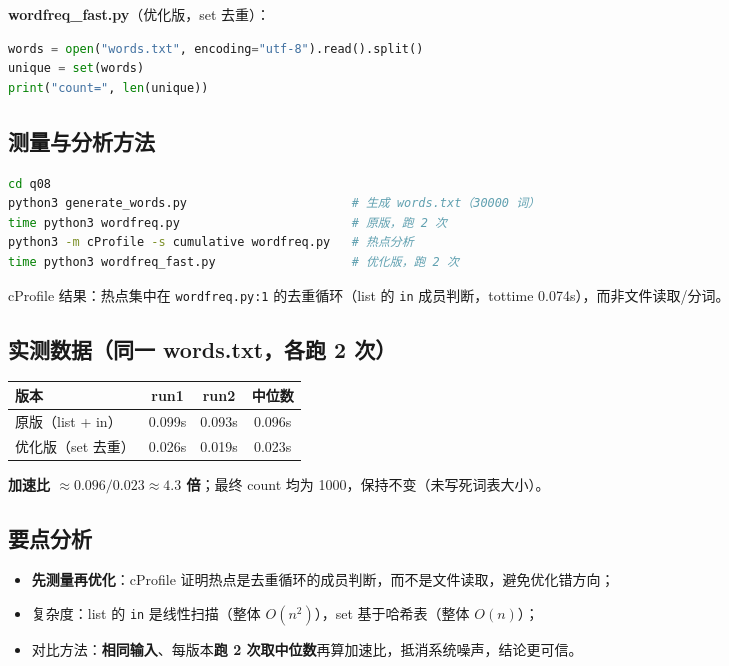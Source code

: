 \documentclass[UTF8,fontset=ubuntu]{ctexart}
\begin{document}
\textbf{wordfreq\_fast.py}（优化版，set 去重）：
\begin{lstlisting}[language=Python]
words = open("words.txt", encoding="utf-8").read().split()
unique = set(words)
print("count=", len(unique))
\end{lstlisting}

\subsection{测量与分析方法}
\begin{lstlisting}[language=bash]
cd q08
python3 generate_words.py                       # 生成 words.txt（30000 词）
time python3 wordfreq.py                        # 原版，跑 2 次
python3 -m cProfile -s cumulative wordfreq.py   # 热点分析
time python3 wordfreq_fast.py                   # 优化版，跑 2 次
\end{lstlisting}

cProfile 结果：热点集中在 \lstinline|wordfreq.py:1| 的去重循环（list 的 \lstinline|in| 成员判断，tottime 0.074s），而非文件读取/分词。

\subsection{实测数据（同一 words.txt，各跑 2 次）}
\begin{center}
\begin{tabular}{@{}lccc@{}}
\toprule
版本 & run1 & run2 & 中位数 \\
\midrule
原版（list + in） & 0.099s & 0.093s & 0.096s \\
优化版（set 去重） & 0.026s & 0.019s & 0.023s \\
\bottomrule
\end{tabular}
\end{center}

\textbf{加速比 $\approx 0.096 / 0.023 \approx 4.3$ 倍}；最终 count 均为 1000，保持不变（未写死词表大小）。

\subsection{要点分析}
\begin{itemize}
\item \textbf{先测量再优化}：cProfile 证明热点是去重循环的成员判断，而不是文件读取，避免优化错方向；
\item 复杂度：list 的 \lstinline|in| 是线性扫描（整体 $O(n^2)$），set 基于哈希表（整体 $O(n)$）；
\item 对比方法：\textbf{相同输入}、每版本\textbf{跑 2 次取中位数}再算加速比，抵消系统噪声，结论更可信。
\end{itemize}
\end{document}
